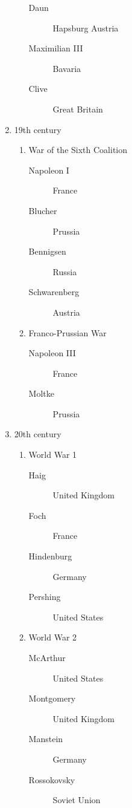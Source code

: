 \begin{enumerate}
\begin{enumerate}
\begin{description}
                \item[Daun]{Hapsburg Austria}
                \item[Maximilian III]{Bavaria}
                \item[Clive]{Great Britain}
            \end{description}
        \end{enumerate}
        \item{19th century}
        \begin{enumerate}
            \item{War of the Sixth Coalition}
            \begin{description}
                \item[Napoleon I]{France}
                \item[Blucher]{Prussia}
                \item[Bennigsen]{Russia}
                \item[Schwarenberg]{Austria}
            \end{description}
            \item{Franco-Prussian War}
            \begin{description}
                \item[Napoleon III]{}France
                \item[Moltke]{Prussia}
            \end{description}
        \end{enumerate}
        \item{20th century}
        \begin{enumerate}
            \item{World War 1}
            \begin{description}
                \item[Haig]{United Kingdom}
                \item[Foch]{France}
            \item[Hindenburg]{Germany}
                \item[Pershing]{United States}
            \end{description}
            \item{World War 2}
            \begin{description}
                \item[McArthur]{United States}
                \item[Montgomery]{United Kingdom}
                \item[Manstein]{Germany}
                \item[Rossokovsky]{Soviet Union}
            \end{description}
        \end{enumerate}
    \end{enumerate}

